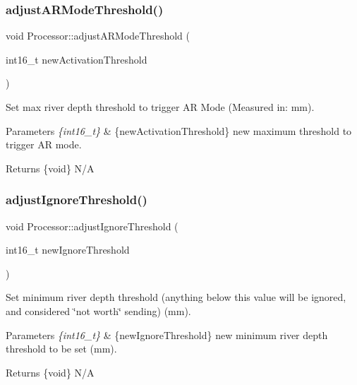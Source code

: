 \subsubsection{\texorpdfstring{adjust\+A\+R\+Mode\+Threshold()}{adjustARModeThreshold()}}
{\footnotesize\ttfamily void Processor\+::adjust\+A\+R\+Mode\+Threshold (\begin{DoxyParamCaption}\item[{int16\+\_\+t}]{new\+Activation\+Threshold }\end{DoxyParamCaption})}

Set max river depth threshold to trigger AR Mode (Measured in\+: mm). 
\begin{DoxyParams}{Parameters}
{\em \{int16\+\_\+t\}} & \{new\+Activation\+Threshold\} new maximum threshold to trigger AR mode. \\
\hline
\end{DoxyParams}
\begin{DoxyReturn}{Returns}
\{void\} N/A 
\end{DoxyReturn}
\mbox{\label{class_processor_a4b4e65040fd7bc17e978412c1af8e0c8}} 
\subsubsection{\texorpdfstring{adjust\+Ignore\+Threshold()}{adjustIgnoreThreshold()}}
{\footnotesize\ttfamily void Processor\+::adjust\+Ignore\+Threshold (\begin{DoxyParamCaption}\item[{int16\+\_\+t}]{new\+Ignore\+Threshold }\end{DoxyParamCaption})}

Set minimum river depth threshold (anything below this value will be ignored, and considered \char`\"{}not worth\char`\"{} sending) (mm). 
\begin{DoxyParams}{Parameters}
{\em \{int16\+\_\+t\}} & \{new\+Ignore\+Threshold\} new minimum river depth threshold to be set (mm). \\
\hline
\end{DoxyParams}
\begin{DoxyReturn}{Returns}
\{void\} N/A 
\end{DoxyReturn}
\mbox{\label{class_processor_a8759b7d9dc2d5f63fa9ca08f9211fd77}} 
